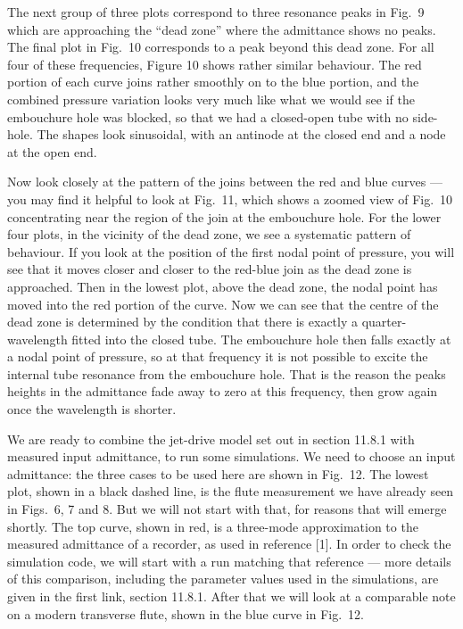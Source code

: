   The next group of three plots correspond to three resonance peaks in Fig.\ 9 
  which are approaching the “dead zone” where the admittance shows no peaks. 
  The final plot in Fig.\ 10 corresponds to a peak beyond this dead zone. For 
  all four of these frequencies, Figure 10 shows rather similar behaviour. The 
  red portion of each curve joins rather smoothly on to the blue portion, and 
  the combined pressure variation looks very much like what we would see if the 
  embouchure hole was blocked, so that we had a closed-open tube with no 
  side-hole. The shapes look sinusoidal, with an antinode at the closed end and 
  a node at the open end. 

  Now look closely at the pattern of the joins between the red and blue curves 
  — you may find it helpful to look at Fig.\ 11, which shows a zoomed view of 
  Fig.\ 10 concentrating near the region of the join at the embouchure hole. 
  For the lower four plots, in the vicinity of the dead zone, we see a 
  systematic pattern of behaviour. If you look at the position of the first 
  nodal point of pressure, you will see that it moves closer and closer to the 
  red-blue join as the dead zone is approached. Then in the lowest plot, above 
  the dead zone, the nodal point has moved into the red portion of the curve. 
  Now we can see that the centre of the dead zone is determined by the 
  condition that there is exactly a quarter-wavelength fitted into the closed 
  tube. The embouchure hole then falls exactly at a nodal point of pressure, so 
  at that frequency it is not possible to excite the internal tube resonance 
  from the embouchure hole. That is the reason the peaks heights in the 
  admittance fade away to zero at this frequency, then grow again once the 
  wavelength is shorter. 


  We are ready to combine the jet-drive model set out in section 11.8.1 with 
  measured input admittance, to run some simulations. We need to choose an 
  input admittance: the three cases to be used here are shown in Fig.\ 12. The 
  lowest plot, shown in a black dashed line, is the flute measurement we have 
  already seen in Figs.\ 6, 7 and 8. But we will not start with that, for 
  reasons that will emerge shortly. The top curve, shown in red, is a 
  three-mode approximation to the measured admittance of a recorder, as used in 
  reference [1]. In order to check the simulation code, we will start with a 
  run matching that reference --- more details of this comparison, including 
  the parameter values used in the simulations, are given in the first link, 
  section 11.8.1. After that we will look at a comparable note on a modern 
  transverse flute, shown in the blue curve in Fig.\ 12. 

